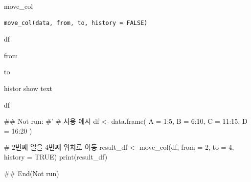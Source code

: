 \documentclass[a4paper]{book}
\begin{document}
%
\begin{Description}
move\_col
\end{Description}
%
\begin{Usage}
\begin{verbatim}
move_col(data, from, to, history = FALSE)
\end{verbatim}
\end{Usage}
%
\begin{Arguments}
\begin{ldescription}
\item[\code{data}] df

\item[\code{from}] from

\item[\code{to}] to

\item[\code{history}] histor show text
\end{ldescription}
\end{Arguments}
%
\begin{Value}
df
\end{Value}
%
\begin{Examples}
\begin{ExampleCode}
\#\# Not run: 
#'
# 사용 예시
df <- data.frame(
  A = 1:5,
  B = 6:10,
  C = 11:15,
  D = 16:20
)

# 2번째 열을 4번째 위치로 이동
result_df <- move_col(df, from = 2, to = 4, history = TRUE)
print(result_df)


## End(Not run)

\end{ExampleCode}
\end{Examples}
\end{document}
